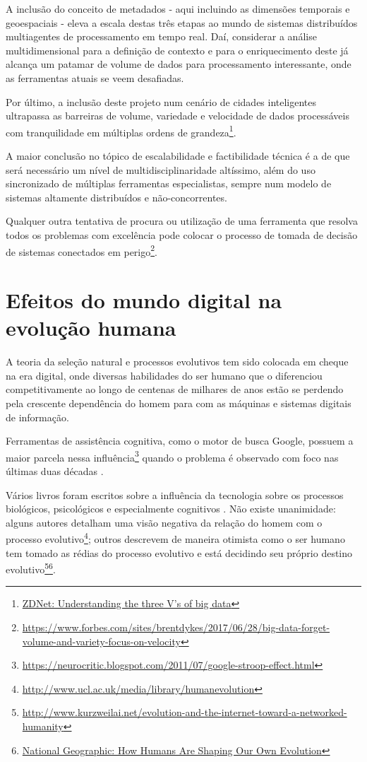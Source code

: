 A inclusão do conceito de metadados - aqui incluindo as dimensões temporais e geoespaciais - eleva a escala destas três etapas ao mundo de sistemas distribuídos multiagentes de processamento em tempo real. Daí, considerar a análise multidimensional para a definição de contexto e para o enriquecimento deste já alcança um patamar de volume de dados para processamento interessante, onde as ferramentas atuais se veem desafiadas. 

Por último, a inclusão deste projeto num cenário de cidades inteligentes ultrapassa as barreiras de volume, variedade e velocidade de dados processáveis com tranquilidade em múltiplas ordens de grandeza\footnote{\href{https://www.zdnet.com/article/volume-velocity-and-variety-understanding-the-three-vs-of-big-data/}{ZDNet: Understanding the three V's of big data}}.

A maior conclusão no tópico de escalabilidade e factibilidade técnica é a de que será necessário um nível de multidisciplinaridade altíssimo, além do uso sincronizado de múltiplas ferramentas especialistas, sempre num modelo de sistemas altamente distribuídos e não-concorrentes.

Qualquer outra tentativa de procura ou utilização de uma ferramenta que resolva todos os problemas com excelência pode colocar o processo de tomada de decisão de sistemas conectados em perigo\footnote{\url{https://www.forbes.com/sites/brentdykes/2017/06/28/big-data-forget-volume-and-variety-focus-on-velocity}}.

\section{Efeitos do mundo digital na evolução humana}

A teoria da seleção natural e processos evolutivos tem sido colocada em cheque na era digital, onde diversas habilidades do ser humano que o diferenciou competitivamente ao longo de centenas de milhares de anos estão se perdendo pela crescente dependência do homem para com as máquinas e sistemas digitais de informação.

Ferramentas de assistência cognitiva, como o motor de busca Google, possuem a maior parcela nessa influência\footnote{\url{https://neurocritic.blogspot.com/2011/07/google-stroop-effect.html}} quando o problema é observado com foco nas últimas duas décadas \cite{Sparrow2011GoogleEO}. 

Vários livros foram escritos sobre a influência da tecnologia sobre os processos biológicos, psicológicos e especialmente cognitivos \cite{theshallows, theglasscage}. Não existe unanimidade: alguns autores detalham uma visão negativa da relação do homem com o processo evolutivo\footnote{\url{http://www.ucl.ac.uk/media/library/humanevolution}}; outros descrevem de maneira otimista como o ser humano tem tomado as rédias do processo evolutivo e está decidindo seu próprio destino evolutivo\footnote{\url{http://www.kurzweilai.net/evolution-and-the-internet-toward-a-networked-humanity}}\footnote{\href{https://www.nationalgeographic.com/magazine/2017/04/evolution-genetics-medicine-brain-technology-cyborg/}{National Geographic: How Humans Are Shaping Our Own Evolution}}.
